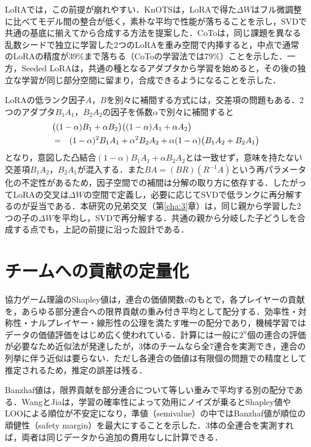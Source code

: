 LoRA\cite{hu2021lora}では，この前提が崩れやすい．KnOTS\cite{stoica2024knots}は，LoRAで得た$\Delta W$はフル微調整に比べてモデル間の整合が低く，素朴な平均で性能が落ちることを示し，SVDで共通の基底に揃えてから合成する方法を提案した．CoTo\cite{zhuang2025coto}は，同じ課題を異なる乱数シードで独立に学習した2つのLoRAを重み空間で内挿すると，中点で通常のLoRAの精度が39\%まで落ちる（CoToの学習法では79\%）ことを示した．一方，Seeded LoRA\cite{salamanca2024seeded}は，共通の種となるアダプタから学習を始めると，その後の独立な学習が同じ部分空間に留まり，合成できるようになることを示した．

LoRAの低ランク因子$A$，$B$を別々に補間する方式には，交差項の問題もある．2つのアダプタ$B_1 A_1$，$B_2 A_2$の因子を係数$\alpha$で別々に補間すると
\begin{eqnarray}
\lefteqn{\bigl((1-\alpha)B_1 + \alpha B_2\bigr)\bigl((1-\alpha)A_1 + \alpha A_2\bigr)} \nonumber \\
& = & (1-\alpha)^2 B_1 A_1 + \alpha^2 B_2 A_2 + \alpha(1-\alpha)\bigl(B_1 A_2 + B_2 A_1\bigr)
\end{eqnarray}
となり，意図した凸結合$(1-\alpha)B_1 A_1 + \alpha B_2 A_2$とは一致せず，意味を持たない交差項$B_1 A_2$，$B_2 A_1$が混入する．また$BA = (BR)(R^{-1}A)$という再パラメータ化の不定性があるため，因子空間での補間は分解の取り方に依存する．したがってLoRAの交叉は$\Delta W$の空間で定義し，必要に応じてSVDで低ランクに再分解するのが妥当である．本研究の兄弟交叉（第\ref{cha:3}章）は，同じ親から学習した2つの子の$\Delta W$を平均し，SVDで再分解する．共通の親から分岐した子どうしを合成する点でも，上記の前提に沿った設計である．

\section{チームへの貢献の定量化}
\label{sec:2.5}

協力ゲーム理論のShapley値\cite{shapley1953value}は，連合の価値関数$v$のもとで，各プレイヤーの貢献を，あらゆる部分連合への限界貢献の重み付き平均として配分する．効率性・対称性・ナルプレイヤー・線形性の公理を満たす唯一の配分であり，機械学習ではデータの価値評価\cite{ghorbani2019data}をはじめ広く使われている\cite{rozemberczki2022shapley}．計算には一般に$2^n$個の連合の評価が必要なため近似法が発達したが，3体のチームなら全7連合を実測でき，連合の列挙に伴う近似は要らない．ただし各連合の価値は有限個の問題での精度として推定されるため，推定の誤差は残る．

Banzhaf値\cite{banzhaf1965weighted}は，限界貢献を部分連合について等しい重みで平均する別の配分である．WangとJia\cite{wang2023databanzhaf}は，学習の確率性によって効用にノイズが乗るとShapley値やLOOによる順位が不安定になり，準値（semivalue）の中ではBanzhaf値が順位の頑健性（safety margin）を最大にすることを示した．3体の全連合を実測すれば，両者は同じデータから追加の費用なしに計算できる．

